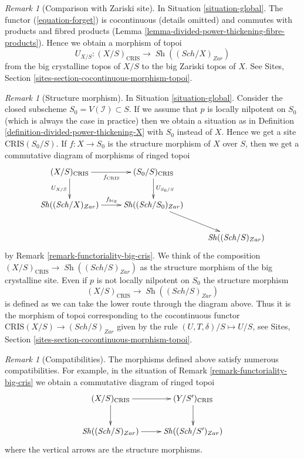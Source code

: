 \documentclass{stacks-project}
\theoremstyle{plain}
\theoremstyle{definition}
\theoremstyle{remark}
\newtheorem{remark}[subsection]{Remark}
\numberwithin{equation}{subsection}
\def\Sch{\mathit{Sch}}
\def\Sh{\mathop{\mathit{Sh}}\nolimits}
\begin{document}
\begin{remark}[Comparison with Zariski site]
\label{remark-compare-big-zariski}
In Situation \ref{situation-global}.
The functor (\ref{equation-forget}) is cocontinuous (details omitted) and
commutes with products and fibred products
(Lemma \ref{lemma-divided-power-thickening-fibre-products}).
Hence we obtain a morphism of topoi
$$
U_{X/S} : (X/S)_{\text{CRIS}} \longrightarrow \Sh((\Sch/X)_{Zar})
$$
from the big crystalline topos of $X/S$ to the big Zariski topos of $X$.
See Sites, Section \ref{sites-section-cocontinuous-morphism-topoi}.
\end{remark}

\begin{remark}[Structure morphism]
\label{remark-big-structure-morphism}
In Situation \ref{situation-global}.
Consider the closed subscheme $S_0 = V(\mathcal{I}) \subset S$.
If we assume that $p$ is locally nilpotent on $S_0$ (which is always
the case in practice) then we obtain a situation as in
Definition \ref{definition-divided-power-thickening-X} with $S_0$ instead
of $X$. Hence we get a site $\text{CRIS}(S_0/S)$. If $f : X \to S_0$ is
the structure morphism of $X$ over $S$, then we get a commutative diagram
of morphisms of ringed topoi
$$
\xymatrix{
(X/S)_{\text{CRIS}}
\ar[r]_{f_{\text{CRIS}}} \ar[d]_{U_{X/S}} &
(S_0/S)_{\text{CRIS}} \ar[d]^{U_{S_0/S}} \\
\Sh((\Sch/X)_{Zar}) \ar[r]^{f_{big}} & \Sh((\Sch/S_0)_{Zar}) \ar[rd] \\
& & \Sh((\Sch/S)_{Zar})
}
$$
by Remark \ref{remark-functoriality-big-cris}. We think of the composition
$(X/S)_{\text{CRIS}} \to \Sh((\Sch/S)_{Zar})$ as the structure morphism of
the big crystalline site. Even if $p$ is not locally nilpotent on $S_0$
the structure morphism
$$
(X/S)_{\text{CRIS}} \longrightarrow \Sh((\Sch/S)_{Zar})
$$
is defined as we can take the lower route through the diagram above. Thus it
is the morphism of topoi corresponding to the cocontinuous
functor $\text{CRIS}(X/S) \to (\Sch/S)_{Zar}$ given by the rule
$(U, T, \delta)/S \mapsto U/S$, see
Sites, Section \ref{sites-section-cocontinuous-morphism-topoi}.
\end{remark}

\begin{remark}[Compatibilities]
\label{remark-compatibilities-big-cris}
The morphisms defined above satisfy numerous compatibilities. For example,
in the situation of Remark \ref{remark-functoriality-big-cris}
we obtain a commutative diagram of ringed topoi
$$
\xymatrix{
(X/S)_{\text{CRIS}} \ar[d] \ar[r] & (Y/S')_{\text{CRIS}} \ar[d] \\
\Sh((\Sch/S)_{Zar}) \ar[r] & \Sh((\Sch/S')_{Zar})
}
$$
where the vertical arrows are the structure morphisms.
\end{remark}
\end{document}
